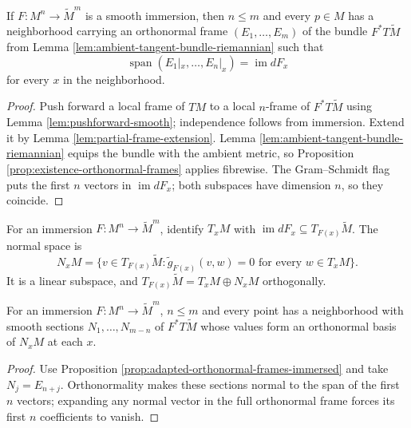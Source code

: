 \begin{proposition}
\label{prop:adapted-orthonormal-frames-immersed}
\leanok
{}
If $F:M^n\to\widetilde M^m$ is a smooth immersion, then $n\le m$ and every $p\in M$ has a neighborhood carrying an orthonormal frame $(E_1,\ldots,E_m)$ of the bundle $F^*T\widetilde M$ from Lemma \ref{lem:ambient-tangent-bundle-riemannian} such that
\[
\operatorname{span}(E_1|_x,\ldots,E_n|_x)=\operatorname{im}dF_x
\]
for every $x$ in the neighborhood.
\end{proposition}
\begin{proof}
\leanok
{}
\sketch Push forward a local frame of $TM$ to a local $n$-frame of $F^*T\widetilde M$ using Lemma \ref{lem:pushforward-smooth}; independence follows from immersion. Extend it by Lemma \ref{lem:partial-frame-extension}. Lemma \ref{lem:ambient-tangent-bundle-riemannian} equips the bundle with the ambient metric, so Proposition \ref{prop:existence-orthonormal-frames} applies fibrewise. The Gram--Schmidt flag puts the first $n$ vectors in $\operatorname{im}dF_x$; both subspaces have dimension $n$, so they coincide.
\end{proof}

\begin{definition}
\label{def:normal-space}
\leanok
{}
For an immersion $F:M^n\to\widetilde M^m$, identify $T_xM$ with $\operatorname{im}dF_x\subseteq T_{F(x)}\widetilde M$. The normal space is
\[
N_xM=\{v\in T_{F(x)}\widetilde M:\widetilde g_{F(x)}(v,w)=0\text{ for every }w\in T_xM\}.
\]
It is a linear subspace, and $T_{F(x)}\widetilde M=T_xM\oplus N_xM$ orthogonally.
\end{definition}

\begin{lemma}
\label{lem:normal-space-orthonormal-frame}
\leanok
{}
For an immersion $F:M^n\to\widetilde M^m$, $n\le m$ and every point has a neighborhood with smooth sections $N_1,\ldots,N_{m-n}$ of $F^*T\widetilde M$ whose values form an orthonormal basis of $N_xM$ at each $x$.
\end{lemma}
\begin{proof}
\leanok
{}
\sketch Use Proposition \ref{prop:adapted-orthonormal-frames-immersed} and take $N_j=E_{n+j}$. Orthonormality makes these sections normal to the span of the first $n$ vectors; expanding any normal vector in the full orthonormal frame forces its first $n$ coefficients to vanish.
\end{proof}

